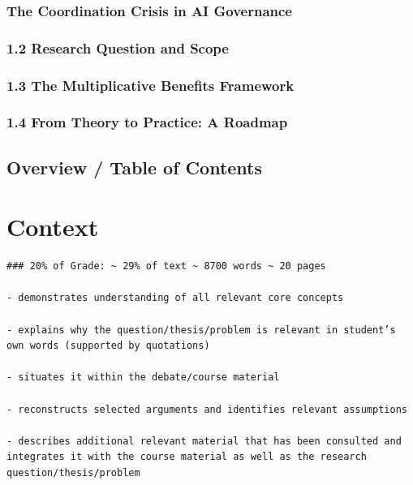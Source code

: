 \documentclass[
  letterpaper,
]{book}
\begin{document}
\subsection{The Coordination Crisis in AI
Governance}\label{the-coordination-crisis-in-ai-governance}

\subsection{1.2 Research Question and
Scope}\label{research-question-and-scope}

\subsection{1.3 The Multiplicative Benefits
Framework}\label{the-multiplicative-benefits-framework}

\subsection{1.4 From Theory to Practice: A
Roadmap}\label{from-theory-to-practice-a-roadmap}

\section{Overview / Table of Contents}\label{overview-table-of-contents}


\chapter{Context}\label{context}

\begin{verbatim}
### 20% of Grade: ~ 29% of text ~ 8700 words ~ 20 pages

- demonstrates understanding of all relevant core concepts

- explains why the question/thesis/problem is relevant in student’s own words (supported by quotations)

- situates it within the debate/course material

- reconstructs selected arguments and identifies relevant assumptions

- describes additional relevant material that has been consulted and integrates it with the course material as well as the research question/thesis/problem
\end{verbatim}
\end{document}

